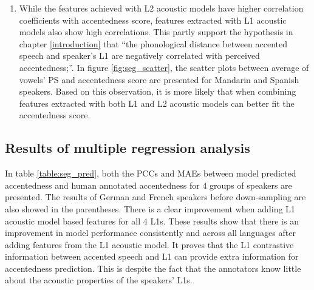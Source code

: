 \begin{enumerate}
 \item While the features achieved with L2 acoustic models have higher correlation coefficients with accentedness score, features extracted with L1 acoustic models also show high correlations. This partly support the hypothesis in chapter \ref{introduction} that ``the phonological distance between accented speech and speaker's L1 are negatively correlated with perceived accentedness;''. In figure \ref{fig:seg_scatter}, the scatter plots between average of vowels' PS and accentedness score are presented for Mandarin and Spanish speakers. Based on this observation, it is more likely that when combining features extracted with both L1 and L2 acoustic models can better fit the accentedness score.
\end{enumerate}

\subsection{Results of multiple regression analysis}

In table \ref{table:seg_pred}, both the PCCs and MAEs between model predicted accentedness and human annotated accentedness for 4 groups of speakers are presented. The results of German and French speakers before down-sampling are also showed in the parentheses. There is a clear improvement when adding L1 acoustic model based features for all 4 L1s. These results show that there is an improvement in model performance consistently and across all languages after adding features from the L1 acoustic model. It proves that the L1 contrastive information between accented speech and L1 can provide extra information for accentedness prediction. This is despite the fact that the annotators know little about the acoustic properties of the speakers' L1s.

